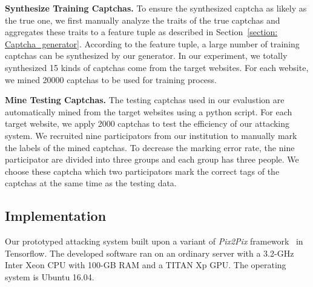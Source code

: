 \noindent \textbf{Synthesize Training Captchas.} To ensure the synthesized captcha as likely as the true one, we first manually analyze the traits of the true captchas and aggregates these traits to a feature tuple as described in Section~\ref{section: Captcha_generator}. According to the feature tuple, a large number of training captchas can be synthesized by our generator. In our experiment, we totally synthesized 15 kinds of captchas come from the target websites. For each website, we mined 20000 captchas to be used for training process.

\noindent \textbf{Mine Testing Captchas.} The testing captchas used in our evalustion are automatically mined from the target websites using a python script. For each target website, we apply 2000 captchas to test the efficiency of our attacking system.  We recruited nine participators from our institution to manually mark the labels of the mined captchas. To decrease the marking error rate, the nine participator are divided into three groups and each group has three people. We choose these captcha which two participators mark the correct tags of the captchas at the same time as the testing data.

\subsection{Implementation}
Our prototyped attacking system built upon a variant of \emph{Pix2Pix} framework~\cite{Pix2PixCode} in Tensorflow. The developed software ran on an ordinary
server with a 3.2-GHz Inter Xeon CPU with 100-GB RAM and a TITAN Xp GPU. The operating system is Ubuntu 16.04.

